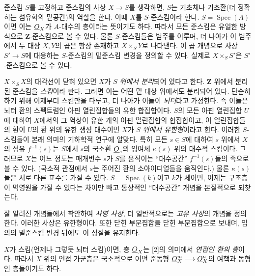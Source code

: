 준스킴 $S$를 고정하고 준스킴의 사상 $X\longrightarrow S$를 생각하면,
$S$는 기초체나 기초환(더 정확히는 섬유화의 밑공간)의 역할을 한다. 이때
$X$를 $S$-준스킴이라 한다. $S=\operatorname{Spec}(A)$이면 이는
$\underline{O}_X$가 $A$-대수의 층이라는 뜻이기도 하다. 따라서 모든 준스킴은
유일한 방식으로 $\mathbf Z$-준스킴으로 볼 수 있다. 물론 $S$-준스킴들은
범주를 이루며, 더 나아가 이 범주에서 두 대상 $X,Y$의 곱은 항상 존재하고
$X\times_S Y$로 나타낸다. 이 곱 개념으로 사상
$S'\longrightarrow S$에 대응하는 $S$-준스킴의 밑준스킴 변경을 정의할
수 있다. 실제로 $X\times_S S'$은 $S'$-준스킴으로 볼 수 있다.

$X\times_S X$의 대각선이 닫혀 있으면 $X$가 $S$ \emph{위에서 분리}되어
있다고 한다. $\mathbf Z$ 위에서 분리된 준스킴을 \emph{스킴}이라 한다.
그러면 이는 어떤 밑 대상 위에서도 분리되어 있다. 단순히 하기 위해 이제부터
스킴만을 다루고, 더 나아가 이들이 \emph{뇌터}라고 가정한다. 즉 이들은
뇌터 환의 스펙트럼인 아핀 열린집합들의 유한 합집합이다. $S$의 모든 아핀
열린집합 $U$에 대하여 $X$에서의 그 역상이 유한 개의 아핀 열린집합의
합집합이고, 이 열린집합들의 환이 $U$의 환 위의 유한 생성 대수이면 $X$가
$S$ \emph{위에서 유한형}이라고 한다. 이러한 $S$-스킴들이 본래 의미의
기하학적 연구에 알맞다. 특히 모든 $s\in S$에 대하여 $s$ 위에서 $X$의
섬유 $f^{-1}(s)$는 $S$에서 $s$의 국소환 $\underline{O}_s$의 잉여체
$\kappa(s)$ 위의 대수적 스킴이다. 그러므로 $X$는 어느 정도는 매개변수
$s$가 $S$를 움직이는 ``대수공간'' $f^{-1}(s)$들의 족으로 볼 수 있다.
(국소적 관점에서 $s$는 주어진 환의 소아이디얼들을 움직인다.) 물론
$\kappa(s)$들은 서로 다른 표수를 가질 수 있다. $S=\operatorname{Spec}(k)$이고
$k$가 체이면, 이제는 구조층이 멱영원을 가질 수 있다는 차이만 빼고 통상적인
``대수공간'' 개념을 본질적으로 되찾는다.

잘 알려진 개념들에서 착안하여 \emph{사영 사상}, 더 일반적으로는
\emph{고유 사상}의 개념을 정의한다. 이러한 사상은 유한형이다. 또한 닫힌
부분집합을 닫힌 부분집합으로 보내며, 임의의 밑준스킴 변경 뒤에도 이 성질을
유지한다.

$X$가 스킴(언제나 그렇듯 뇌터 스킴)이면, 층 $\underline{O}_X$는 [2]의 의미에서
\emph{연접인 환의 층}이다. 따라서 $X$ 위의 연접 가군층은 국소적으로 어떤
준동형 $\underline{O}_X^{m}\longrightarrow\underline{O}_X^{n}$의 여핵과 동형인 층들이기도
하다.


